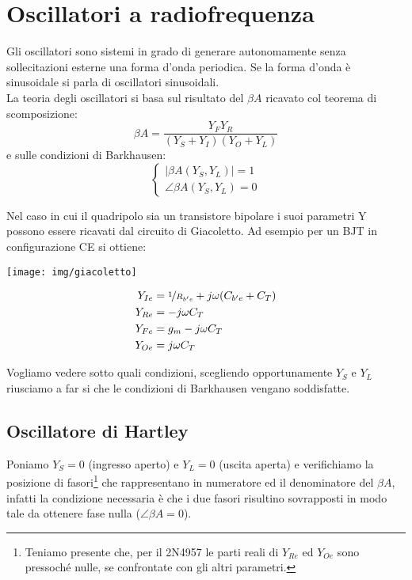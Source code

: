 \chapter{Oscillatori a radiofrequenza}

Gli oscillatori sono sistemi in grado di generare autonomamente senza sollecitazioni esterne una forma d'onda periodica. Se la forma d'onda è sinusoidale si parla di oscillatori sinusoidali.
\\
La teoria degli oscillatori si basa sul risultato del $\beta A$ ricavato col teorema di scomposizione:
\[\beta A = \frac{Y_F Y_R}{(Y_S+Y_I)(Y_O+Y_L)}\]
e sulle condizioni di Barkhausen:
\[
\begin{cases}
| \beta A (Y_S,Y_L) | = 1\\
\angle \beta A (Y_S,Y_L)  = 0
\end{cases}
\]

Nel caso in cui il quadripolo sia un transistore bipolare i suoi parametri Y possono essere ricavati dal circuito di Giacoletto. Ad esempio per un BJT in configurazione CE si ottiene:

\begin{multicols}{2}
	\texttt{[image: img/giacoletto]}
	
	\[
	\begin{aligned}
	Y_{Ie} &
	= \nicefrac{1}{R_{b'e}} + j \omega (C_{b'e} + C_T)\\
	Y_{Re} &
	= - j \omega C_T\\
	Y_{Fe} &
	= g_m - j \omega C_T\\
	Y_{Oe} &
	= j \omega C_T
	\end{aligned}
	\]
\end{multicols}

Vogliamo vedere sotto quali condizioni, scegliendo opportunamente $Y_S$ e $Y_L$ riusciamo a far si che le condizioni di Barkhausen vengano soddisfatte.

\section{Oscillatore di Hartley}
Poniamo $Y_S = 0$ (ingresso aperto) e $Y_L =0$ (uscita aperta) e verifichiamo la posizione di fasori\footnote{Teniamo presente che, per il 2N4957 le parti reali di $Y_{Re}$ ed $Y_{Oe}$ sono pressoché nulle, se confrontate con gli altri parametri.} che rappresentano in numeratore ed il denominatore del $\beta A$, infatti la condizione necessaria è che i due fasori risultino sovrapposti in modo tale da ottenere fase nulla ($\angle\beta A = 0$). 


